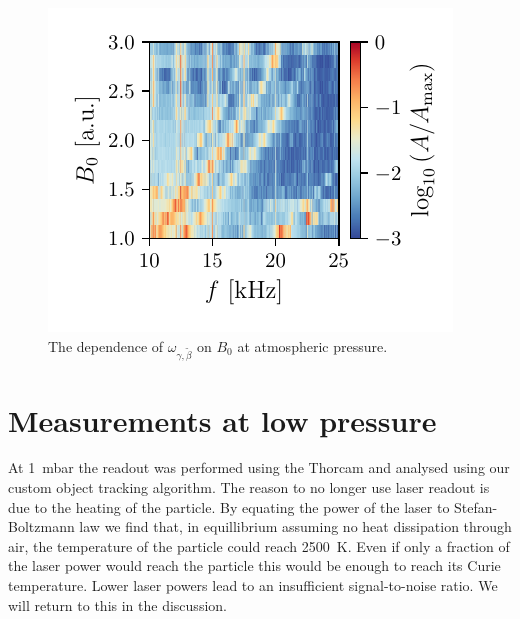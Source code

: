 \begin{figure}
    \centering
    \includegraphics{figures/data/rotational_mode_dependence_on_B0.pdf}
    \caption{The dependence of $\omega_{\gamma,\tilde\beta}$ on $B_0$ at atmospheric pressure.}
    \label{fig:rotational-mode-dependence-1bar}
\end{figure}

\section{Measurements at low pressure}
\label{sec:measurements-at-low-pressure}
At \qty{1}{\milli\bar} the readout was performed using the Thorcam and analysed using our custom object tracking algorithm. The reason to no longer use laser readout is due to the heating of the particle. By equating the power of the laser to Stefan-Boltzmann law we find that, in equillibrium assuming no heat dissipation through air, the temperature of the particle could reach \qty{2500}{\kelvin}. Even if only a fraction of the laser power would reach the particle this would be enough to reach its Curie temperature. Lower laser powers lead to an insufficient signal-to-noise ratio. We will return to this in the discussion.

